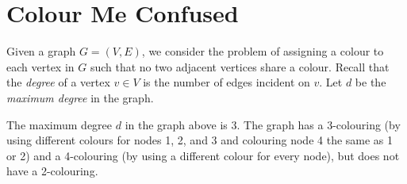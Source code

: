 \section{Colour Me Confused}

Given a graph $G = (V, E)$, we consider the problem of assigning a colour to each vertex in $G$ such that no two adjacent vertices share a colour. Recall that the \emph{degree} of a vertex $v\in V$ is the number of edges incident on $v$. Let $d$ be the \emph{maximum degree} in the graph. 

\begin{center}
\end{center}

The maximum degree $d$ in the graph above is $3$. The graph has a 3-colouring (by using different colours for nodes 1, 2, and 3 and colouring node 4 the same as 1 or 2) and a 4-colouring (by using a different colour for every node), but does not have a 2-colouring.

